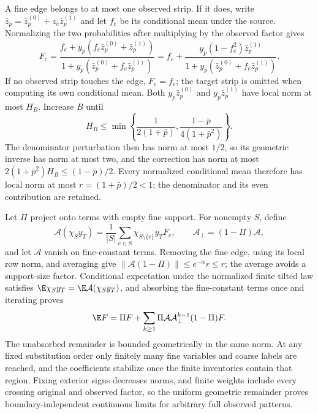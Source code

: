 A fine edge belongs to at most one observed strip. If it does, write
\(\bar z_p=\bar z_p^{(0)}+z_e\bar z_p^{(1)}\) and let \(f_e\) be its
conditional mean under the source. Normalizing the two probabilities after
multiplying by the observed factor gives
\begin{equation}
 F_e=\frac{f_e+y_p(f_e\bar z_p^{(0)}+\bar z_p^{(1)})}
          {1+y_p(\bar z_p^{(0)}+f_e\bar z_p^{(1)})}
     =f_e+\frac{y_p(1-f_e^2)\bar z_p^{(1)}}
               {1+y_p(\bar z_p^{(0)}+f_e\bar z_p^{(1)})}.
 \label{eq:rg-spatial-proof-normalized-tilted-row}
\end{equation}
If no observed strip touches the edge, \(F_e=f_e\); the target strip is
omitted when computing its own conditional mean. Both
\(y_p\bar z_p^{(0)}\) and \(y_p\bar z_p^{(1)}\) have local norm at most
\(H_B\). Increase \(B\) until
\begin{equation}
 H_B\le\min\left\{\frac1{2(1+\bar p)},
                       \frac{1-\bar p}{4(1+\bar p^2)}\right\}.
 \label{eq:rg-spatial-proof-basin-row-gate}
\end{equation}
The denominator perturbation then has norm at most \(1/2\), so its
geometric inverse has norm at most two, and the correction has norm at most
\(2(1+\bar p^2)H_B\le(1-\bar p)/2\). Every normalized conditional mean
therefore has local norm at most \(r=(1+\bar p)/2<1\); the denominator and
its even contribution are retained.

Let \(\Pi\) project onto terms with empty fine support. For nonempty \(S\),
define
\begin{equation}
 \mathcal A(\chi_Sy_T)=\frac1{|S|}\sum_{e\in S}
              \chi_{S\setminus\{e\}}y_TF_e,\qquad
 \mathcal A_\perp=(1-\Pi)\mathcal A,
 \label{eq:rg-spatial-proof-absorbing-operator}
\end{equation}
and let \(\mathcal A\) vanish on fine-constant terms. Removing the fine
edge, using its local row norm, and averaging give
\(\|\mathcal A(1-\Pi)\|\le e^{-\alpha}r\le r\); the average avoids a
support-size factor. Conditional expectation under the normalized finite
tilted law satisfies \(\E\chi_Sy_T=\E\mathcal A(\chi_Sy_T)\), and absorbing
the fine-constant terms once and iterating proves
\begin{equation}
 \E F=\Pi F+\sum_{k\ge1}\Pi\mathcal A\mathcal A_\perp^{k-1}(1-\Pi)F.
 \label{eq:rg-spatial-proof-absorbing-series}
\end{equation}
The unabsorbed remainder is bounded geometrically in the same norm. At any
fixed substitution order only finitely many fine variables and coarse
labels are reached, and the coefficients stabilize once the finite
inventories contain that region. Fixing exterior signs decreases norms, and
finite weights include every crossing original and observed factor, so the
uniform geometric remainder proves boundary-independent continuous limits
for arbitrary full observed patterns.

